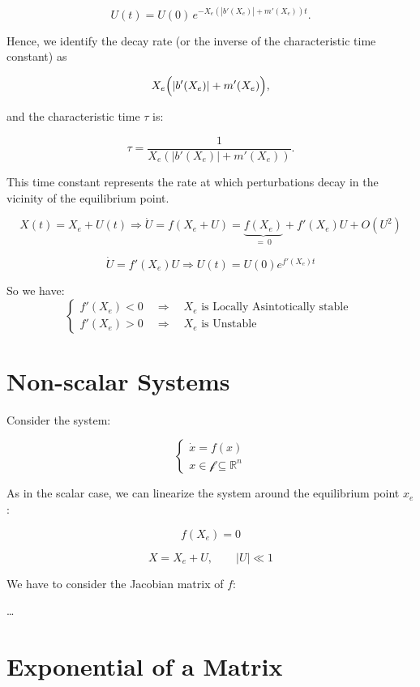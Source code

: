 $$
U(t) = U(0)\,e^{-X_e (|b'(X_e)| + m'(X_e))t}.
$$

Hence, we identify the decay rate (or the inverse of the characteristic time constant) as

$$
X_e\Bigl(|b'(X_e)| + m'(X_e)\Bigr),
$$

and the characteristic time $\tau$ is:

$$
\tau = \frac{1}{X_e \left(|b'(X_e)| + m'(X_e)\right)}.
$$

This time constant represents the rate at which perturbations decay in the vicinity of the equilibrium point.


\newpage

$$
X(t) = X_e + U(t) \Rightarrow \dot U = f(X_e + U) = \underbrace{f(X_e)}_{=\ 0} + f'(X_e)U + O(U^2)
$$

$$
\dot U = f'(X_e)U \Rightarrow U(t) = U(0) e^{f'(X_e)t}
$$

So we have:
$$
\begin{cases}
f'(X_e) < 0 \quad \Rightarrow \quad X_e \text{ is Locally Asintotically stable } \\
f'(X_e) > 0 \quad \Rightarrow \quad X_e \text{ is Unstable }
\end{cases}
$$

\vspace{2em}

\section{Non-scalar Systems}

Consider the system:

$$
\begin{cases}
    \dot x = f(x) \\
    x \in \mathcal{f} \subseteq \mathbb{R}^n
\end{cases}
$$

As in the scalar case, we can linearize the system around the equilibrium point $x_e$:

$$
f(X_e) = 0
$$

$$
X = X_e + U, \quad \quad |U| \ll 1
$$

We have to consider the Jacobian matrix of $f$:

\dots

\newpage

\section{Exponential of a Matrix}

